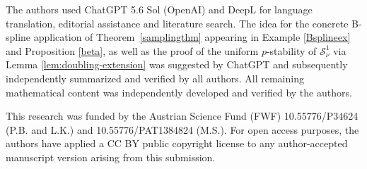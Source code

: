 \documentclass{amsart}
\newcommand{\MS}[0]{{\mathcal{S}}}
\begin{document}

The authors used ChatGPT 5.6 Sol (OpenAI) and DeepL for language translation,  editorial assistance and literature search. The idea for the concrete B-spline application of Theorem~\ref{samplingthm} appearing in Example \ref{Bsplineex} and Proposition \ref{beta}, as well as the proof of the uniform $p$-stability of $\MS_\nu^1$ via Lemma \ref{lem:doubling-extension} was suggested by ChatGPT and subsequently independently summarized and verified by all authors. All remaining mathematical content was independently developed and verified by the authors.

This research was funded by the Austrian Science Fund (FWF) 10.55776/P34624 (P.B. and L.K.) and 10.55776/PAT1384824 (M.S.).
For open
access purposes, the authors have applied a CC BY public copyright license to any author-accepted manuscript
version arising from this submission.


\end{document}
